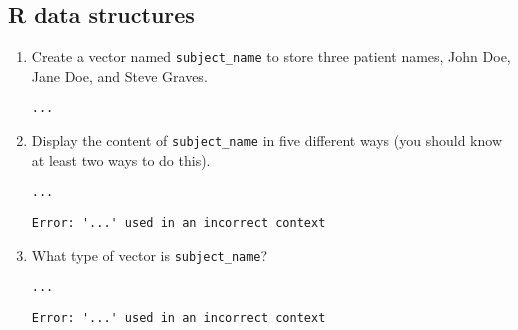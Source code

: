 \documentclass[11pt]{article}
\begin{document}
\subsection{R data structures}
\label{sec:org011ffce}

\begin{enumerate}
\item Create a vector named \texttt{subject\_name} to store three patient names,
John Doe, Jane Doe, and Steve Graves.
\begin{verbatim}
...
\end{verbatim}

\item Display the content of \texttt{subject\_name} in five different ways (you
should know at least two ways to do this).
\begin{verbatim}
...
\end{verbatim}

\begin{verbatim}
Error: '...' used in an incorrect context
\end{verbatim}

\item What type of vector is \texttt{subject\_name}? 
\begin{verbatim}
...
\end{verbatim}

\begin{verbatim}
Error: '...' used in an incorrect context
\end{verbatim}
\end{enumerate}
\end{document}
